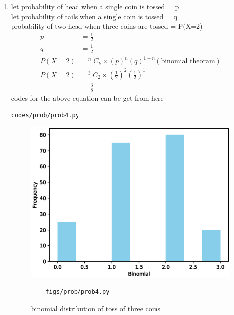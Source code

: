 \renewcommand{\theequation}{\theenumi}
\begin{enumerate}[label=\arabic*.,ref=\thesubsection.\theenumi]
\item let probability of head when a single coin is tossed = p
\\
let probability of tails when a single coin is tossed = q
\\
probability of two head when three coins are tossed = P(X=2)
\begin{align}
p &= \frac{1}{2}
\\
q &= \frac{1}{2}
\\
P(X=2) &= ^nC_k \times \left(p\right)^n \left(q\right)^{1-n}\left(\text{binomial theoram}\right)
\\
P(X=2) &= ^3C_2 \times \left(\frac{1}{2}\right)^2 \left(\frac{1}{2}\right)^1
\\
&= \frac{3}{8}
\end{align}
codes for the above equation can be get from here
\begin{lstlisting}
codes/prob/prob4.py
\end{lstlisting}
\begin{figure}[!ht]
	\centering
	\includegraphics[width=\columnwidth]{./figures/prob/prob4.eps}
	\caption{binomial distribution of toss of three coins }
	\label{fig:bt2}
	\begin{lstlisting}
	figs/prob/prob4.py
	\end{lstlisting}
\end{figure}
\end{enumerate}